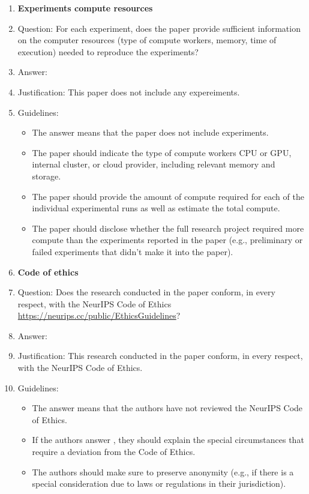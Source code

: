 \documentclass{article}
\theoremstyle{definition}
\theoremstyle{remark}
\begin{document}
\begin{enumerate}
\item {\bf Experiments compute resources}
    \item[] Question: For each experiment, does the paper provide sufficient information on the computer resources (type of compute workers, memory, time of execution) needed to reproduce the experiments?
    \item[] Answer:  \answerNA{} %
    \item[] Justification: This paper does not include any expereiments.
    \item[] Guidelines:
    \begin{itemize}
        \item The answer \answerNA{} means that the paper does not include experiments.
        \item The paper should indicate the type of compute workers CPU or GPU, internal cluster, or cloud provider, including relevant memory and storage.
        \item The paper should provide the amount of compute required for each of the individual experimental runs as well as estimate the total compute. 
        \item The paper should disclose whether the full research project required more compute than the experiments reported in the paper (e.g., preliminary or failed experiments that didn't make it into the paper). 
    \end{itemize}
    
\item {\bf Code of ethics}
    \item[] Question: Does the research conducted in the paper conform, in every respect, with the NeurIPS Code of Ethics \url{https://neurips.cc/public/EthicsGuidelines}?
    \item[] Answer: \answerYes{} %
    \item[] Justification: This research conducted in the paper conform, in every respect, with the NeurIPS Code of Ethics.
    \item[] Guidelines:
    \begin{itemize}
        \item The answer \answerNA{} means that the authors have not reviewed the NeurIPS Code of Ethics.
        \item If the authors answer \answerNo, they should explain the special circumstances that require a deviation from the Code of Ethics.
        \item The authors should make sure to preserve anonymity (e.g., if there is a special consideration due to laws or regulations in their jurisdiction).
    \end{itemize}



\end{enumerate}
\end{document}

